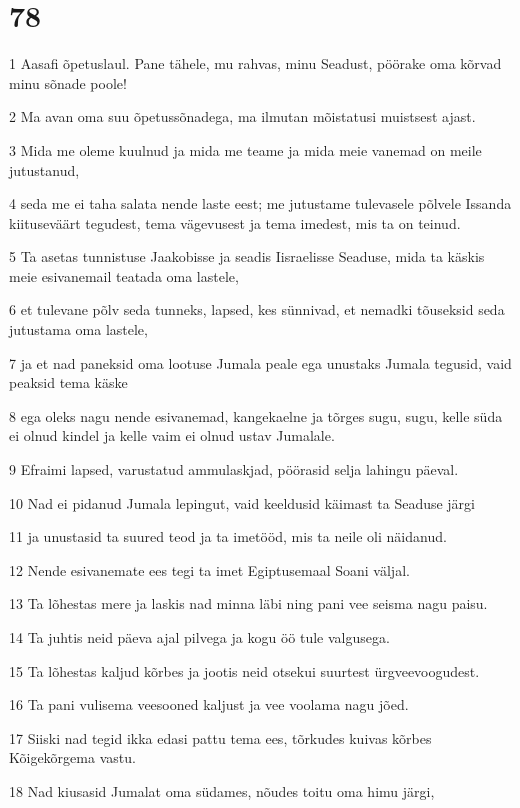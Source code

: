 \chapter{78}

\par 1 Aasafi õpetuslaul. Pane tähele, mu rahvas, minu Seadust, pöörake oma kõrvad minu sõnade poole!
\par 2 Ma avan oma suu õpetussõnadega, ma ilmutan mõistatusi muistsest ajast.
\par 3 Mida me oleme kuulnud ja mida me teame ja mida meie vanemad on meile jutustanud,
\par 4 seda me ei taha salata nende laste eest; me jutustame tulevasele põlvele Issanda kiituseväärt tegudest, tema vägevusest ja tema imedest, mis ta on teinud.
\par 5 Ta asetas tunnistuse Jaakobisse ja seadis Iisraelisse Seaduse, mida ta käskis meie esivanemail teatada oma lastele,
\par 6 et tulevane põlv seda tunneks, lapsed, kes sünnivad, et nemadki tõuseksid seda jutustama oma lastele,
\par 7 ja et nad paneksid oma lootuse Jumala peale ega unustaks Jumala tegusid, vaid peaksid tema käske
\par 8 ega oleks nagu nende esivanemad, kangekaelne ja tõrges sugu, sugu, kelle süda ei olnud kindel ja kelle vaim ei olnud ustav Jumalale.
\par 9 Efraimi lapsed, varustatud ammulaskjad, pöörasid selja lahingu päeval.
\par 10 Nad ei pidanud Jumala lepingut, vaid keeldusid käimast ta Seaduse järgi
\par 11 ja unustasid ta suured teod ja ta imetööd, mis ta neile oli näidanud.
\par 12 Nende esivanemate ees tegi ta imet Egiptusemaal Soani väljal.
\par 13 Ta lõhestas mere ja laskis nad minna läbi ning pani vee seisma nagu paisu.
\par 14 Ta juhtis neid päeva ajal pilvega ja kogu öö tule valgusega.
\par 15 Ta lõhestas kaljud kõrbes ja jootis neid otsekui suurtest ürgveevoogudest.
\par 16 Ta pani vulisema veesooned kaljust ja vee voolama nagu jõed.
\par 17 Siiski nad tegid ikka edasi pattu tema ees, tõrkudes kuivas kõrbes Kõigekõrgema vastu.
\par 18 Nad kiusasid Jumalat oma südames, nõudes toitu oma himu järgi,
